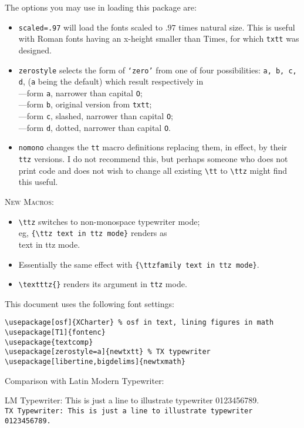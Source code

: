 \documentclass{article}
\begin{document}
The options you may use in loading this package are:
\begin{itemize}
\item {\tt scaled=.97} will load the fonts scaled to $.97$ times natural size. This is useful with Roman fonts having an x-height smaller than Times, for which {\tt txtt} was designed.
\item
{\tt zerostyle} selects the form of {\tt `zero'} from one of four possibilities: {\tt a, b, c, d}, ({\tt a} being the default) which result respectively in\\[6pt] 
{} ---form {\tt a}, narrower than capital {\tt O};\\
{} ---form {\tt b}, original version from {\tt txtt};\\
{} ---form {\tt c}, slashed, narrower than capital {\tt O};\\
{} ---form {\tt d}, dotted, narrower than capital {\tt O}. 
\item
{\tt nomono} changes the {\tt tt} macro definitions replacing them, in effect,  by their {\tt ttz} versions. I do not recommend this, but perhaps someone who does not print code and does not wish to change all existing \verb|\tt| to \verb|\ttz| might find this useful.
\end{itemize}
\textsc{New Macros:}
\begin{itemize}
\item
\verb|\ttz| switches to non-monospace typewriter mode; \\
eg, \verb|{\ttz text in ttz mode}| renders as \\
{\ttz text in ttz mode}.
\item Essentially the same effect with \verb|{\ttzfamily text in ttz mode}|.
\item \verb|\textttz{}| renders its argument in {\tt ttz} mode.
\end{itemize}

This document uses the following font settings:
\begin{verbatim}
\usepackage[osf]{XCharter} % osf in text, lining figures in math
\usepackage[T1]{fontenc}
\usepackage{textcomp}
\usepackage[zerostyle=a]{newtxtt} % TX typewriter
\usepackage[libertine,bigdelims]{newtxmath}
\end{verbatim}

Comparison with Latin Modern Typewriter: 

\textsf{LM Typewriter: This is just a line to illustrate typewriter 0123456789.}\\
\texttt{TX Typewriter: This is just a line to illustrate typewriter 0123456789.}\\
\end{document}
